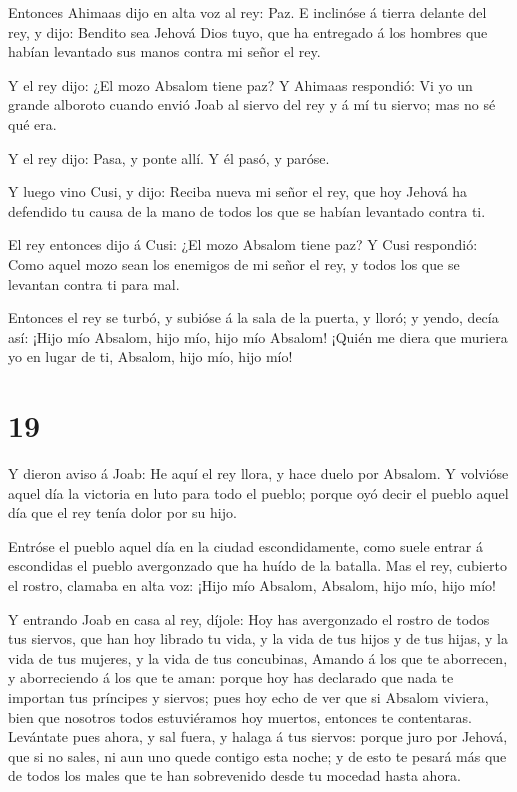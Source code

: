  Entonces Ahimaas dijo en alta voz al rey: Paz. E inclinóse
á tierra delante del rey, y dijo: Bendito sea Jehová Dios tuyo, que ha
entregado á los hombres que habían levantado sus manos contra mi señor
el rey.

 Y el rey dijo: ¿El mozo Absalom tiene paz? Y Ahimaas
respondió: Vi yo un grande alboroto cuando envió Joab al siervo del rey
y á mí tu siervo; mas no sé qué era.

 Y el rey dijo: Pasa, y ponte allí. Y él pasó, y paróse.

 Y luego vino Cusi, y dijo: Reciba nueva mi señor el rey,
que hoy Jehová ha defendido tu causa de la mano de todos los que se
habían levantado contra ti.

 El rey entonces dijo á Cusi: ¿El mozo Absalom tiene paz? Y
Cusi respondió: Como aquel mozo sean los enemigos de mi señor el rey, y
todos los que se levantan contra ti para mal.

 Entonces el rey se turbó, y subióse á la sala de la
puerta, y lloró; y yendo, decía así: ¡Hijo mío Absalom, hijo mío, hijo
mío Absalom! ¡Quién me diera que muriera yo en lugar de ti, Absalom,
hijo mío, hijo mío!

\hypertarget{section-18}{%
\section{19}\label{section-18}}

 Y dieron aviso á Joab: He aquí el rey llora, y hace duelo
por Absalom.  Y volvióse aquel día la victoria en luto para
todo el pueblo; porque oyó decir el pueblo aquel día que el rey tenía
dolor por su hijo.

 Entróse el pueblo aquel día en la ciudad escondidamente,
como suele entrar á escondidas el pueblo avergonzado que ha huído de la
batalla.  Mas el rey, cubierto el rostro, clamaba en alta
voz: ¡Hijo mío Absalom, Absalom, hijo mío, hijo mío!

 Y entrando Joab en casa al rey, díjole: Hoy has avergonzado
el rostro de todos tus siervos, que han hoy librado tu vida, y la vida
de tus hijos y de tus hijas, y la vida de tus mujeres, y la vida de tus
concubinas,  Amando á los que te aborrecen, y aborreciendo á
los que te aman: porque hoy has declarado que nada te importan tus
príncipes y siervos; pues hoy echo de ver que si Absalom viviera, bien
que nosotros todos estuviéramos hoy muertos, entonces te contentaras.
 Levántate pues ahora, y sal fuera, y halaga á tus siervos:
porque juro por Jehová, que si no sales, ni aun uno quede contigo esta
noche; y de esto te pesará más que de todos los males que te han
sobrevenido desde tu mocedad hasta ahora.

